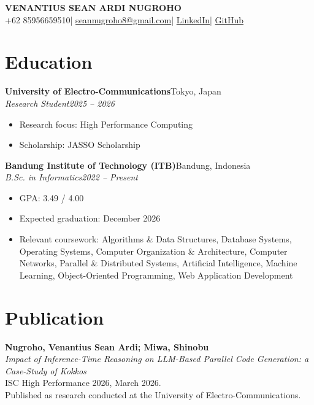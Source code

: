 \documentclass[11pt,a4paper]{article}
\newcommand{\entry}[4]{%
  \Needspace{4\baselineskip}%
  \textbf{#1}\hfill #2\\
  \textit{#3}\hfill\textit{#4}\par}
\begin{document}
\begin{center}
{\LARGE\bfseries VENANTIUS SEAN ARDI NUGROHO}\\[6pt]
+62 85956659510\quad |\quad
\href{mailto:seannugroho8@gmail.com}{seannugroho8@gmail.com}\quad |\quad
\href{https://www.linkedin.com/in/venantius-sean-ardi-nugroho/}{LinkedIn}\quad |\quad
\href{https://github.com/Leaguemen}{GitHub}
\end{center}

\section*{Education}
\entry{University of Electro-Communications}{Tokyo, Japan}{Research Student}{2025 -- 2026}
\begin{itemize}
\item Research focus: High Performance Computing
\item Scholarship: JASSO Scholarship
\end{itemize}
\entry{Bandung Institute of Technology (ITB)}{Bandung, Indonesia}{B.Sc. in Informatics}{2022 -- Present}
\begin{itemize}
\item GPA: 3.49 / 4.00
\item Expected graduation: December 2026
\item Relevant coursework: Algorithms \& Data Structures, Database Systems, Operating Systems, Computer Organization \& Architecture, Computer Networks, Parallel \& Distributed Systems, Artificial Intelligence, Machine Learning, Object-Oriented Programming, Web Application Development
\end{itemize}

\section*{Publication}
\textbf{Nugroho, Venantius Sean Ardi; Miwa, Shinobu}\\
\textit{Impact of Inference-Time Reasoning on LLM-Based Parallel Code Generation: a Case-Study of Kokkos}\\
ISC High Performance 2026, March 2026.\\
Published as research conducted at the University of Electro-Communications.
\end{document}
